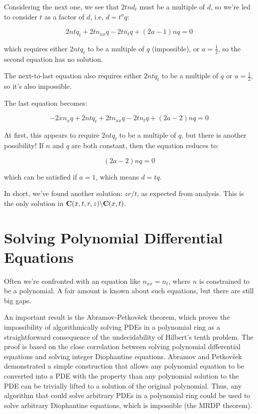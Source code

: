 \documentclass{article}
\newcommand{\C}{\ensuremath{{\bf C}}}
\begin{document}
Considering the next one, we see that $2tnd_t$ must be a multiple of $d$, so we're led to
consider $t$ as a factor of $d$, i.e, $d=t^a q$:

$$2nt q_t + 2tn_{xx}q -2tn_tq +(2a-1)nq = 0$$

which requires either $2ntq_t$ to be a multiple of $q$ (impossible), or $a=\frac{1}{2}$,
so the second equation has no solution.

The next-to-last equation also requires either $2ntq_t$ to be a multiple of $q$ or $a=\frac{1}{2}$, so it's also impossible.

The last equation becomes:


$$-2xn_xq  + 2 n t q_t +2tn_{xx}q -2tn_tq +(2a-2)nq = 0$$

At first, this appears to require $2ntq_t$ to be a multiple of $q$, but there is another possibility!
If $n$ and $q$ are both constant, then the equation reduces to:

$$(2a-2)nq = 0$$

which can be satisfied if $a=1$, which means $d=tq$.

In short, we've found another solution: $zr/t$, as expected from analysis.
This is the only solution in $\C(x,t,r,z) \backslash \C(x,t)$.

\vfill\eject

\section*{Solving Polynomial Differential Equations}

Often we're confronted with an equation like $n_{xx} = n_t$, where $n$
is constrained to be a polynomial.  A fair amount is known about
such equations, but there are still big gaps.

An important result is the Abramov-Petkov\v sek theorem, which proves
the impossibility of algorithmically solving PDEs in a polynomial ring
as a straightforward consequence of the undecidability of Hilbert's
tenth problem.  The proof is based on the close correlation between
solving polynomial differential equations and solving integer Diophantine
equations.  Abramov and Petkov\v sek demonstrated a simple
construction that allows any polynomial equation to be converted
into a PDE with the property than any polynomial solution to the PDE
can be trivially lifted to a solution of the original polynomial.
Thus, any algorithm that could solve arbitrary PDEs in a polynomial
ring could be used to solve arbitrary Diophantine equations, which
is impossible (the MRDP theorem).
\end{document}
